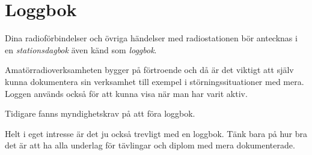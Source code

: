 \chapter{Loggbok}

Dina radioförbindelser och övriga händelser med radiostationen bör antecknas i
en \emph{stationsdagbok} även känd som \emph{loggbok}.

Amatörradioverksamheten bygger på förtroende och då är det viktigt att själv
kunna dokumentera sin verksamhet till exempel i störningssituationer med mera.
Loggen används också för att kunna visa när man har varit aktiv.

\begin{historiabox}
Tidigare fanns myndighetskrav på att föra loggbok.
\end{historiabox}

Helt i eget intresse är det ju också trevligt med en loggbok.
Tänk bara på hur bra det är att ha alla underlag för tävlingar och diplom med
mera dokumenterade.

